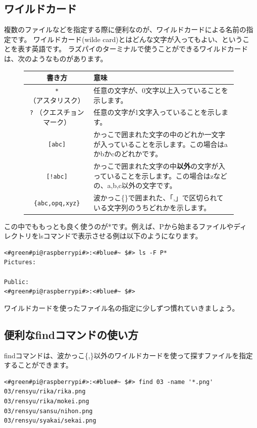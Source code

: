 \subsection{ワイルドカード}
複数のファイルなどを指定する際に便利なのが、ワイルドカードによる名前の指定です。
ワイルドカード(wilde card)とはどんな文字が入ってもよい、ということを表す英語です。
ラズパイのターミナルで使うことができるワイルドカードは、次のようなものがあります。
\newpage %
\begin{figure}[h]
    \begin{tabular}{cp{}} \hline
        書き方 & 意味 \\ \hline
        \texttt{*} （アスタリスク）  & 任意の文字が、0文字以上入っていることを示します。\\
        \texttt{?} （クエスチョンマーク） & 任意の文字が1文字入っていることを示します。\\
        \texttt{[abc]} & かっこで囲まれた文字の中のどれか一文字が入っていることを示します。この場合はaかbかcのどれかです。\\
        \texttt{[!abc]} & かっこで囲まれた文字の中{\bf 以外}の文字が入っていることを示します。この場合はzなどの、a,b,c以外の文字です。\\
        \texttt{\{abc,opq,xyz\}} & 波かっこ\{\}で囲まれた、「,」で区切られている文字列のうちどれかを示します。\\ \hline
    \end{tabular}
\end{figure}

この中でももっとも良く使うのが*です。例えば、Pから始まるファイルやディレクトリをlsコマンドで表示させる例は以下のようになります。
\begin{lstlisting}[caption=ワイルドカードの使い方, label=wildcard]
<#green#pi@raspberrypi#>:<#blue#~ $#> ls -F P*
Pictures:

Public:
<#green#pi@raspberrypi#>:<#blue#~ $#>
\end{lstlisting}

ワイルドカードを使ったファイル名の指定に少しずつ慣れていきましょう。

\subsection{便利なfindコマンドの使い方}
findコマンドは、波かっこ\{,\}以外のワイルドカードを使って探すファイルを指定することができます。

\begin{lstlisting}[caption=03ディレクトリからPNGファイルを探す, label=findwild]
<#green#pi@raspberrypi#>:<#blue#~ $#> find 03 -name '*.png'
03/rensyu/rika/rika.png
03/rensyu/rika/mokei.png
03/rensyu/sansu/nihon.png
03/rensyu/syakai/sekai.png
\end{lstlisting}

